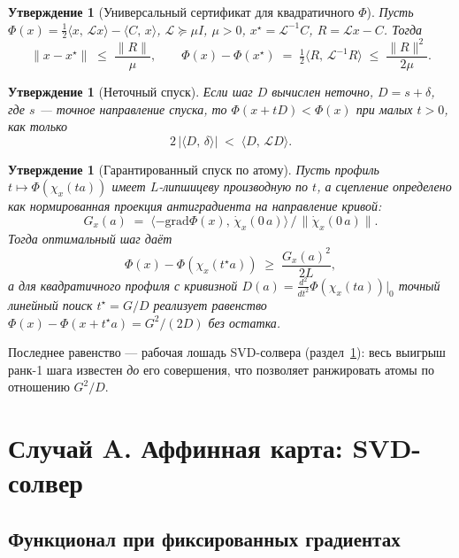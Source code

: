 \documentclass[11pt,a4paper]{article}
\newcommand{\Id}{I}
\newcommand{\ip}[2]{\langle #1,\,#2\rangle}
\newcommand{\grad}{\mathrm{grad}}
\newcommand{\Lop}{\mathcal{L}}
\theoremstyle{plain}
\newtheorem{prop}[theorem]{Утверждение}
\theoremstyle{definition}
\theoremstyle{remark}
\begin{document}
\begin{prop}[Универсальный сертификат для квадратичного $\Phi$]\label{prop:cert}
Пусть $\Phi(x)=\tfrac12\ip{x}{\Lop x}-\ip{C}{x}$, $\Lop\succeq\mu\Id$, $\mu>0$,
$x^\star=\Lop^{-1}C$, $R=\Lop x-C$. Тогда
\begin{equation}\label{eq:cert}
\|x-x^\star\| \;\le\; \frac{\|R\|}{\mu},
\qquad
\Phi(x)-\Phi(x^\star)\;=\;\tfrac12\ip{R}{\Lop^{-1}R}\;\le\;\frac{\|R\|^2}{2\mu}.
\end{equation}
\end{prop}

\begin{prop}[Неточный спуск]\label{prop:inexact}
Если шаг $D$ вычислен неточно, $D=s+\delta$, где $s$ --- точное направление
спуска, то $\Phi(x+tD)<\Phi(x)$ при малых $t>0$, как только
\begin{equation}\label{eq:inexact}
2\,\bigl|\ip{D}{\delta}\bigr| \;<\; \ip{D}{\Lop D}.
\end{equation}
\end{prop}

\begin{prop}[Гарантированный спуск по атому]\label{prop:descent}
Пусть профиль $t\mapsto\Phi(\chi_x(ta))$ имеет $L$-липшицеву производную
по $t$, а сцепление определено как нормированная проекция антиградиента
на направление кривой:
\[
G_x(a)\;=\;\langle-\grad\Phi(x),\,\dot\chi_x(0\,a)\rangle\,\big/\,\|\dot\chi_x(0\,a)\| .
\]
Тогда оптимальный шаг даёт
\begin{equation}\label{eq:atom-gain}
\Phi(x)-\Phi(\chi_x(t^\star a))\;\ge\;\frac{G_x(a)^2}{2L},
\end{equation}
а для \emph{квадратичного} профиля с кривизной $D(a)=\frac{d^2}{dt^2}\Phi(\chi_x(ta))\bigr|_{0}$
точный линейный поиск $t^\star=G/D$ реализует равенство
$\Phi(x)-\Phi(x+t^\star a)=G^2/(2D)$ без остатка.
\end{prop}

Последнее равенство --- рабочая лошадь SVD-солвера (раздел~\ref{sec:svd}): весь
выигрыш ранк-1 шага известен \emph{до} его совершения, что позволяет ранжировать
атомы по отношению $G^2/D$.

\section{Случай A. Аффинная карта: SVD-солвер}\label{sec:svd}

\subsection{Функционал при фиксированных градиентах}
\end{document}
